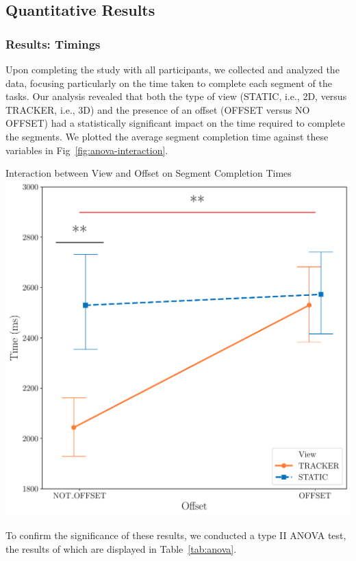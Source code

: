 \subsection{Quantitative Results}
\subsubsection{Results: Timings}
Upon completing the study with all participants, we collected and analyzed the data, focusing particularly on the time taken to complete each segment of the tasks. Our analysis revealed that both the type of view (STATIC, i.e., 2D, versus TRACKER, i.e., 3D) and the presence of an offset (OFFSET versus NO OFFSET) had a statistically significant impact on the time required to complete the segments. We plotted the average segment completion time against these variables in Fig~\ref{fig:anova-interaction}.

\begin{figureBox}[label={fig:anova-interaction}, width=0.8\linewidth]{Interaction between View and Offset on Segment Completion Times}
    \includegraphics[width = 1.0\linewidth]{./evaluation/figures/survery/anova-interaction.pdf}
\end{figureBox}

To confirm the significance of these results, we conducted a type II ANOVA test, the results of which are displayed in Table~\ref{tab:anova}. \\

